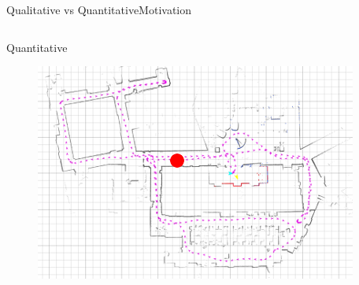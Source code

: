 \begin{frame}{Qualitative vs Quantitative}{Motivation}
\begin{columns}
\begin{block}{ Quantitative }
\begin{minipage}[t][5cm][t]{.9\textwidth}
\begin{figure}
	\centering
	\includegraphics[width=\linewidth]{figure/robot_localization}
\end{figure}
\end{minipage}

\end{block}

\end{columns}

\end{frame}

